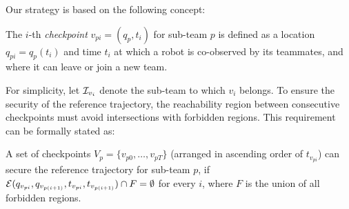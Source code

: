 \documentclass[10pt,twocolumn,twoside]{IEEEtran}
\newcommand{\news}{\color{blue}}
\begin{document}
{\news %
Our strategy is based on the following concept:
\begin{definition}
The $i$-th \emph{checkpoint} $v_{pi}=(q_{p},t_{i})$ for sub-team $p$ is defined as a location $q_{pi}=q_{p}(t_i)$ and time $t_{i}$ at which a robot is co-observed by its teammates, and where it can leave or join a new team.
\end{definition}
For simplicity, let $\mathcal{I}_{v_{i}}$ denote the sub-team to which $v_{i}$ belongs. %
To ensure the security of the reference trajectory, the reachability region between consecutive checkpoints must avoid intersections with forbidden regions. This requirement can be formally stated as:
\begin{remark}
  A set of checkpoints $V_{p}=\{ v_{p0}, \dots ,v_{pT}\}$ (arranged in ascending order of $t_{v_{pi}}$) can secure the reference trajectory for sub-team $p$, if $\mathcal{E}(q_{v_{pi}}, q_{v_{p(i+1)}}, t_{v_{pi}},t_{v_{p(i+1)}}) \cap F = \emptyset$ for every $i$, where $F$ is the union of all forbidden regions.
  \end{remark}
}
\end{document}
